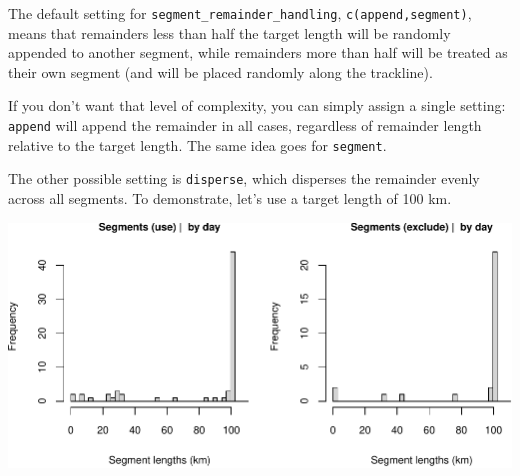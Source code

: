 \documentclass[
]{book}
\newenvironment{Shaded}{\begin{snugshade}}{\end{snugshade}}
\newcommand{\CommentTok}[1]{\textcolor[rgb]{0.56,0.35,0.01}{\textit{#1}}}
\newcommand{\DataTypeTok}[1]{\textcolor[rgb]{0.13,0.29,0.53}{#1}}
\newcommand{\DecValTok}[1]{\textcolor[rgb]{0.00,0.00,0.81}{#1}}
\newcommand{\KeywordTok}[1]{\textcolor[rgb]{0.13,0.29,0.53}{\textbf{#1}}}
\newcommand{\NormalTok}[1]{#1}
\newcommand{\OperatorTok}[1]{\textcolor[rgb]{0.81,0.36,0.00}{\textbf{#1}}}
\newcommand{\OtherTok}[1]{\textcolor[rgb]{0.56,0.35,0.01}{#1}}
\newcommand{\StringTok}[1]{\textcolor[rgb]{0.31,0.60,0.02}{#1}}
\begin{document}
The default setting for \texttt{segment\_remainder\_handling}, \texttt{c(\textquotesingle{}append\textquotesingle{},\textquotesingle{}segment\textquotesingle{})}, means that remainders less than half the target length will be randomly appended to another segment, while remainders more than half will be treated as their own segment (and will be placed randomly along the trackline).

If you don't want that level of complexity, you can simply assign a single setting: \texttt{\textquotesingle{}append\textquotesingle{}} will append the remainder in all cases, regardless of remainder length relative to the target length. The same idea goes for \texttt{\textquotesingle{}segment\textquotesingle{}}.

The other possible setting is \texttt{\textquotesingle{}disperse\textquotesingle{}}, which disperses the remainder evenly across all segments. To demonstrate, let's use a target length of 100 km.

\begin{Shaded}
\end{Shaded}

\includegraphics{figures/unnamed-chunk-381-1.pdf}
\end{document}
